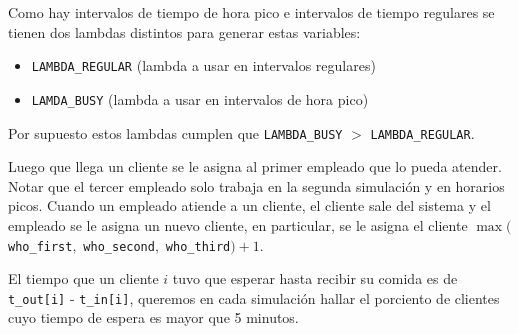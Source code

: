 \documentclass{article}
\newenvironment{allintypewriter}{\ttfamily}{\par}
\begin{document}
        Como hay intervalos de tiempo de hora pico e intervalos de tiempo regulares se tienen dos lambdas distintos para generar
        estas variables:
            \begin{itemize}[label=\textbullet]
                \item \texttt{LAMBDA\_REGULAR} (lambda a usar en intervalos regulares)
                \item \texttt{LAMDA\_BUSY} (lambda a usar en intervalos de hora pico)
            \end{itemize}

        Por supuesto estos lambdas cumplen que \texttt{LAMBDA\_BUSY} $>$ \texttt{LAMBDA\_REGULAR}.

        Luego que llega un cliente se le asigna al primer empleado que lo pueda atender. Notar que el tercer empleado solo
        trabaja en la segunda simulación y en horarios picos. Cuando un empleado atiende a un cliente, el cliente sale del sistema y
        el empleado se le asigna un nuevo cliente, en particular, se le asigna el cliente $\max($\texttt{who\_first}$,$ \texttt{who\_second}$,$ \texttt{who\_third}$) + 1$.

        El tiempo que un cliente $i$ tuvo que esperar hasta recibir su comida es de \texttt{t\_out[i]} - \texttt{t\_in[i]}, queremos en cada simulación
        hallar el porciento de clientes cuyo tiempo de espera es mayor que 5 minutos.



\end{document}
